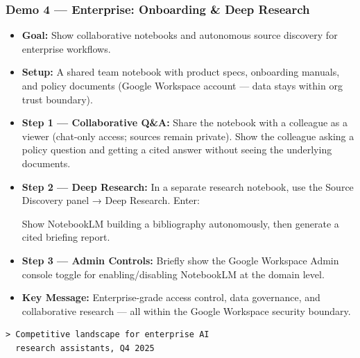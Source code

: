 \begin{frame}[fragile]\frametitle{Demo 4 — Enterprise: Onboarding \& Deep Research}
  \begin{itemize}
    \item \textbf{Goal:} Show collaborative notebooks and autonomous source discovery for enterprise workflows.
    \item \textbf{Setup:} A shared team notebook with product specs, onboarding manuals, and policy documents (Google Workspace account — data stays within org trust boundary).
    \item \textbf{Step 1 — Collaborative Q\&A:} Share the notebook with a colleague as a viewer (chat-only access; sources remain private). Show the colleague asking a policy question and getting a cited answer without seeing the underlying documents.
    \item \textbf{Step 2 — Deep Research:} In a separate research notebook, use the Source Discovery panel → Deep Research. Enter:

    Show NotebookLM building a bibliography autonomously, then generate a cited briefing report.
    \item \textbf{Step 3 — Admin Controls:} Briefly show the Google Workspace Admin console toggle for enabling/disabling NotebookLM at the domain level.
    \item \textbf{Key Message:} Enterprise-grade access control, data governance, and collaborative research — all within the Google Workspace security boundary.
  \end{itemize}
  
\begin{lstlisting}
> Competitive landscape for enterprise AI
  research assistants, Q4 2025
\end{lstlisting}  
\end{frame}

